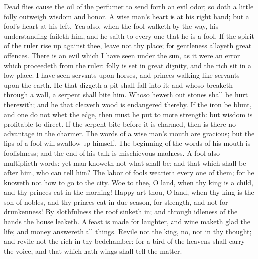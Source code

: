 Dead flies cause the oil of the perfumer to send forth an evil odor; so doth a little folly outweigh wisdom and honor. A wise man’s heart is at his right hand; but a fool’s heart at his left. Yea also, when the fool walketh by the way, his understanding faileth him, and he saith to every one that he is a fool. If the spirit of the ruler rise up against thee, leave not thy place; for gentleness allayeth great offences.  There is an evil which I have seen under the sun, as it were an error which proceedeth from the ruler: folly is set in great dignity, and the rich sit in a low place. I have seen servants upon horses, and princes walking like servants upon the earth.  He that diggeth a pit shall fall into it; and whoso breaketh through a wall, a serpent shall bite him. Whoso heweth out stones shall be hurt therewith; and he that cleaveth wood is endangered thereby. If the iron be blunt, and one do not whet the edge, then must he put to more strength: but wisdom is profitable to direct. If the serpent bite before it is charmed, then is there no advantage in the charmer.  The words of a wise man’s mouth are gracious; but the lips of a fool will swallow up himself. The beginning of the words of his mouth is foolishness; and the end of his talk is mischievous madness. A fool also multiplieth words: yet man knoweth not what shall be; and that which shall be after him, who can tell him? The labor of fools wearieth every one of them; for he knoweth not how to go to the city.  Woe to thee, O land, when thy king is a child, and thy princes eat in the morning! Happy art thou, O land, when thy king is the son of nobles, and thy princes eat in due season, for strength, and not for drunkenness! By slothfulness the roof sinketh in; and through idleness of the hands the house leaketh. A feast is made for laughter, and wine maketh glad the life; and money answereth all things. Revile not the king, no, not in thy thought; and revile not the rich in thy bedchamber: for a bird of the heavens shall carry the voice, and that which hath wings shall tell the matter. 

